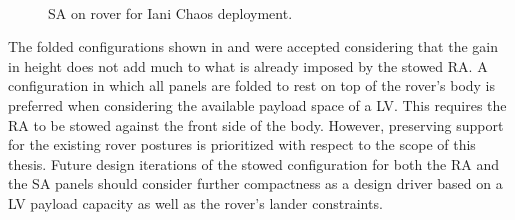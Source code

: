 \begin{figure}[h]
\begin{subfigure}[t]{\subfigureWidth}
		\label{fig:sub:solar-array-on-rover-for-iani-chaos-deployed}
	\end{subfigure}\\[0.8ex]
    \caption[Solar array on rover for Iani Chaos deployment]
            {\ac{SA} on rover for Iani Chaos deployment.}
    \label{fig:solar-array-on-rover-iani-chaos}
\vspace{-2ex}
\end{figure}

\vspace{0.5cm}

The folded configurations shown in  and  were accepted considering that the gain in height does not add much to what is already imposed by the stowed \ac{RA}. A configuration in which all panels are folded to rest on top of the rover's body is preferred when considering the available payload space of a \ac{LV}. This requires the \ac{RA} to be stowed against the front side of the body. However, preserving support for the existing rover postures is prioritized with respect to the scope of this thesis. Future design iterations of the stowed configuration for both the \ac{RA} and the \ac{SA} panels should consider further compactness as a design driver based on a \ac{LV} payload capacity as well as the rover's lander constraints.

\vspace{0.5cm}

